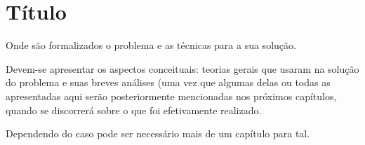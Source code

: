 \chapter{Título}
Onde são formalizados o problema e as técnicas para a sua solução. 
 
Devem-se apresentar os aspectos conceituais: teorias gerais que usaram na solução do problema e suas breves análises (uma vez que algumas delas ou todas as apresentadas aqui serão posteriormente mencionadas nos próximos capítulos, quando se discorrerá sobre o que foi efetivamente realizado.

Dependendo do caso pode ser necessário mais de um capítulo para tal. 

